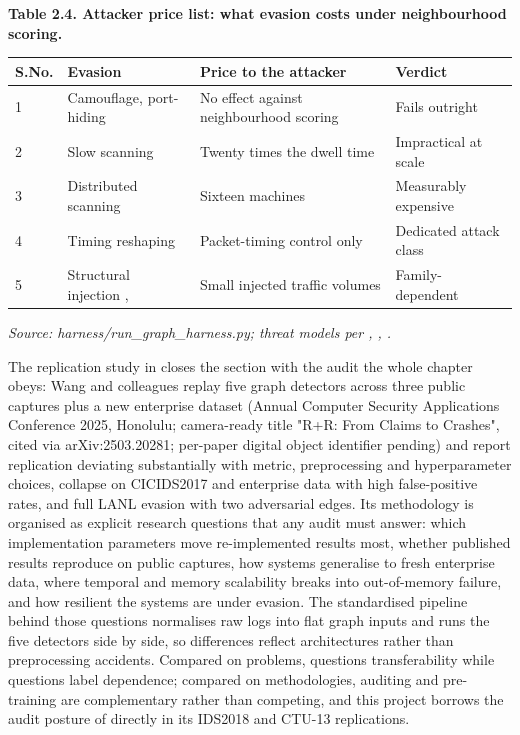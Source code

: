 \begin{center}\textbf{Table 2.4. Attacker price list: what evasion costs under neighbourhood scoring.}\end{center}

\begin{center}
\begin{tabular}{llll}
\toprule

S.No. & Evasion & Price to the attacker & Verdict \\

\midrule

1 & Camouflage, port-hiding & No effect against neighbourhood scoring & Fails outright \\

2 & Slow scanning & Twenty times the dwell time & Impractical at scale \\

3 & Distributed scanning & Sixteen machines & Measurably expensive \\

4 & Timing reshaping \cite{k32} & Packet-timing control only & Dedicated attack class \\

5 & Structural injection \cite{k25}, \cite{k26} & Small injected traffic volumes & Family-dependent \\

\bottomrule
\end{tabular}
\end{center}

{\small\textit{Source: harness/run\_graph\_harness.py; threat models per \cite{k25}, \cite{k26}, \cite{k32}.}}

The replication study in \cite{k23} closes the section with the audit the whole chapter obeys: Wang and colleagues replay five graph detectors across three public captures plus a new enterprise dataset (Annual Computer Security Applications Conference 2025, Honolulu; camera-ready title "R+R: From Claims to Crashes", cited via arXiv:2503.20281; per-paper digital object identifier pending) and report replication deviating substantially with metric, preprocessing and hyperparameter choices, collapse on CICIDS2017 and enterprise data with high false-positive rates, and full LANL evasion with two adversarial edges. Its methodology is organised as explicit research questions that any audit must answer: which implementation parameters move re-implemented results most, whether published results reproduce on public captures, how systems generalise to fresh enterprise data, where temporal and memory scalability breaks into out-of-memory failure, and how resilient the systems are under evasion. The standardised pipeline behind those questions normalises raw logs into flat graph inputs and runs the five detectors side by side, so differences reflect architectures rather than preprocessing accidents. Compared on problems, \cite{k23} questions transferability while \cite{k20} questions label dependence; compared on methodologies, auditing and pre-training are complementary rather than competing, and this project borrows the audit posture of \cite{k23} directly in its IDS2018 and CTU-13 replications.

